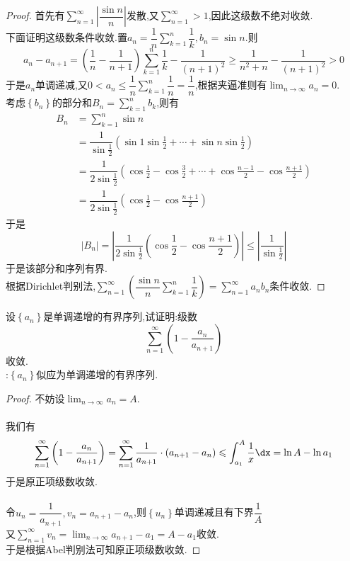 \documentclass{ctexart}
\begin{document}
\begin{proof}
    首先有$\displaystyle\sum_{n=1}^\infty\left|\dfrac{\sin n}{n}\right|$发散,又$\displaystyle\sum_{n=1}^{\infty}>1$,因此这级数不绝对收敛.\\
    下面证明这级数条件收敛.置$\displaystyle a_n=\dfrac{1}{n}\sum_{k=1}^{n}\dfrac1k,b_n=\sin n$.则
    \[a_{n}-a_{n+1}=\left(\dfrac{1}{n}-\dfrac{1}{n+1}\right)\sum_{k=1}^n\dfrac1k-\dfrac{1}{(n+1)^2}\geqslant\dfrac{1}{n^2+n}-\dfrac{1}{(n+1)^2}>0\]
    于是$a_n$单调递减,又$0<a_n\leqslant\dfrac1n\displaystyle\sum_{k=1}^n\dfrac1n=\dfrac1n$,根据夹逼准则有$\displaystyle\lim_{n\to\infty}a_n=0$.\\
    考虑$\left\{b_n\right\}$的部分和$B_n=\displaystyle\sum_{k=1}^{n}b_k$,则有
    \[\begin{aligned}
        B_n
        &= \sum_{k=1}^{n}\sin n \\
        &= \dfrac{1}{\sin\frac12}\left(\sin1\sin\frac12+\cdots+\sin n\sin\frac12\right) \\
        &= \dfrac{1}{2\sin\frac12}\left(\cos\frac12-\cos\frac32+\cdots+\cos\frac{n-1}{2}-\cos\frac{n+1}{2}\right) \\
        &= \dfrac{1}{2\sin\frac12}\left(\cos\frac12-\cos\frac{n+1}{2}\right)
    \end{aligned}\]
    于是
    \[\left|B_n\right|=\left|\dfrac{1}{2\sin\frac12}\left(\cos\frac12-\cos\frac{n+1}{2}\right)\right|\leqslant\left|\dfrac{1}{\sin\frac12}\right|\]
    于是该部分和序列有界.\\
    根据Dirichlet判别法,$\displaystyle\sum_{n=1}^\infty\left(\dfrac{\sin n}{n}\sum_{k=1}^{n}\dfrac1k\right)=\sum_{n=1}^\infty a_nb_n$条件收敛.
\end{proof}
\begin{problem}[L.9.4]
    设$\left\{a_n\right\}$是单调递增的有界序列,试证明:级数
    \[\sum_{n=1}^\infty\left(1-\dfrac{a_n}{a_{n+1}}\right)\]
    收敛.\\
    :$\left\{a_n\right\}$似应为单调递增的有界序列.
\end{problem}
\begin{proof}
    不妨设$\displaystyle\lim_{n\to\infty}a_n=A$.\\
    \\
    我们有
    \[\sum_{n=1}^\infty\left(1-\dfrac{a_n}{a_{n+1}}\right)=\sum_{n=1}^\infty \dfrac{1}{a_{n+1}}\cdot\left(a_{n+1}-a_n\right)\leqslant\int_{a_1}^A\dfrac1x\dx=\ln A-\ln a_1\]
    于是原正项级数收敛.\\
    \\
    令$u_n=\dfrac{1}{a_{n+1}},v_n=a_{n+1}-a_n$,则$\left\{u_n\right\}$单调递减且有下界$\dfrac1A$\\
    又$\displaystyle\sum_{n=1}^{\infty}v_n=\lim_{n\to\infty}a_{n+1}-a_1=A-a_1$收敛.\\
    于是根据Abel判别法可知原正项级数收敛.
\end{proof}
\end{document}

